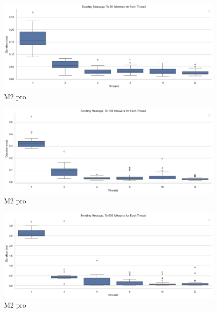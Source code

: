 \documentclass[a4paper]{article}
\begin{document}
\begin{figure}[H]
	\centering
	\includegraphics[width = \linewidth]{Images/SendingMessageBox50Followers.png}
	\caption{M2 pro}
\end{figure}
\begin{figure}[H]
	\centering
	\includegraphics[width = \linewidth]{Images/SendingMessageBox100Follower.png}
	\caption{M2 pro}
\end{figure}
\begin{figure}[H]
	\centering
	\includegraphics[width = \linewidth]{Images/SendingMessageBox500Follower.png}
	\caption{M2 pro}
\end{figure}
\end{document}
